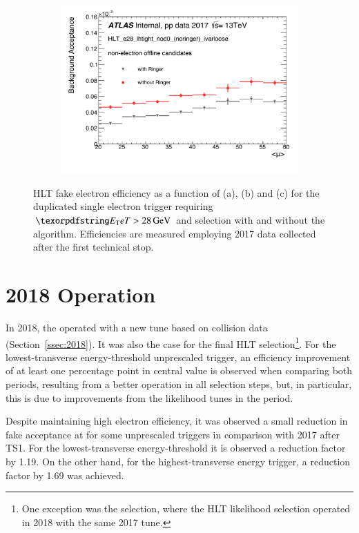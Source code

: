 \begin{figure}[h!tb]
\begin{center}
\begin{subfigure}[c]{.59\textwidth}
\centering
\includegraphics[width=\textwidth]{sections/04_operation/figures/efficiencies/eff_EGAM7_e28_ringer_and_noringer_2017_after_ts1_mu.pdf}
\caption{}
\end{subfigure}
\caption{HLT fake electron efficiency as a function of \et (a), \eta (b) and
\avgmu (c) for the duplicated single electron trigger requiring $\et >
\SI{28}{\GeV}$ and \tight selection with and without the \rnn{} algorithm.
Efficiencies are measured employing 2017 data collected after the first technical stop.}%
\label{fig:e28_triggers_fake_hlt}
\end{center}
\end{figure}


\FloatBarrier

\section{2018 Operation}\label{ssec:2018_ringer_operation}

In 2018, the \rnn{} operated with a new tune based on collision data
(Section~\ref{ssec:2018}). It was also the case for the final HLT
selection\footnote{One exception was the \medium{} selection, where the HLT
likelihood selection operated in 2018 with the same 2017 tune.}. For the
lowest-transverse energy-threshold unprescaled trigger, an efficiency
improvement of at least one percentage point in central value is observed when
comparing both periods, resulting from a better operation in all selection
steps, but, in particular, this is due to improvements from the likelihood tunes in the period.

Despite maintaining high electron efficiency, it was observed a small reduction in fake acceptance at \fastcalo{} for some unprescaled triggers in comparison with 2017 after TS1. For the lowest-transverse energy-threshold it is observed a reduction factor by 1.19. On the other hand, for the highest-transverse energy trigger, a reduction factor by 1.69 was achieved.


